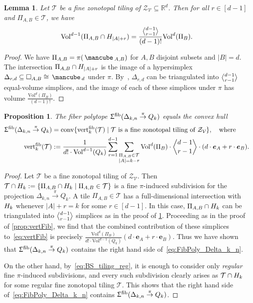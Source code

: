 \documentclass[11pt]{amsart}
\theoremstyle{plain}
\newtheorem{proposition}[theorem]{Proposition}
\newtheorem{lemma}[theorem]{Lemma}
\theoremstyle{definition}
\def\R{\mathbb{R}}
\def\V{\mathcal{V}}
\def\e{{\bm{e}}}
\def\conv{\mathrm{conv}}
\def\Zon{\mathcal{Z}}
\def\ZV{\Zon_\V}
\def\cube{\mbox{\,\mancube\,}}
\def\Vol{\mathrm{Vol}}
\def\vert{\mathrm{vert}}
\def\vertFib{\vert^\fiber}
\def\fiber{{\operatorname{fib}}}
\def\FibPoly{\Upsigma^\fiber}
\def\pito{\overset \pi \to}
\def\VC{\V}
\def\Tcal{\mathcal{T}}
\def\Tiling{\Tcal}
\def\tile{\Pi}
\newcommand\summa[2]{\sum_{\substack{#1 \\ #2}}}
\def\sumlevel#1{\summa{\tile_{A,B}\in\Tiling}{|A|=#1}}
\def\Voldd{\Vol^{d-1}}
\def\VolX(#1){\Vol^d(\tile_{#1})}
\def\VolB{\VolX(B)}
\let\subset\subseteq
\newcommand{\Euli}{\genfrac{\langle}{\rangle}{0pt}{}}
\def\Eul(#1,#2){\Euli{#1}{#2}}
\begin{document}
\begin{lemma}\label{lemma:Eul}
Let $\Tiling$ be a fine zonotopal tiling of $\ZV \subset \R^d$.
	Then for all $r\in[d-1]$ and $\tile_{A,B}\in\Tiling$, we have
\begin{equation}\label{eq:Eul}
\Voldd(\tile_{A,B}\cap \Hyp_{|A|+r})=\frac{\Eul(d-1,r-1)}{(d-1)!} \VolB.
\end{equation}
\end{lemma}
\begin{proof}
	We have $\tile_{A,B} = \pi(\cube_{A,B})$ for $A, B$ disjoint subsets
	and $|B| = d$.  The intersection $\tile_{A,B}\cap \Hyp_{|A|+r}$ is the image of a hypersimplex $\Delta_{r,d}\subset\square_{A,B}\cong\cube_d$ under $\pi$. By~\cite{Sta77}, $\Delta_{r,d}$ can be triangulated into $\Eul(d-1,r-1)$ equal-volume simplices, 
	and the image of each of these simplices under $\pi$ has volume $\frac{\VolB}{(d-1)!}$.
\end{proof}
\begin{proposition}
The fiber polytope $\FibPoly(\Delta_{k,n}\pito Q_k)$ equals the convex hull
\begin{align}\label{eq:FibPoly_Delta_k_n}
  \FibPoly(\Delta_{k,n}\pito Q_k)&=\conv\{\vertFib_k(\Tiling)\mid \Tiling\text{ is a fine zonotopal tiling of $\Zon_\VC$}\},\quad\text{where} \\
\label{eq:vertFib_k}
  \vertFib_k(\Tiling)&:=\frac1{d!\cdot \Voldd(Q_k)} \sum_{r=1}^{d-1} \sumlevel{k-r} \VolB\cdot \Eul(d-1,r-1)\cdot  (d\cdot \e_A+r\cdot  \e_B ).
\end{align}
\end{proposition}
\begin{proof}
Let $\Tiling$ be a fine zonotopal tiling of $\ZV$. Then $\Tiling\cap \Hyp_k:=\{\tile_{A,B}\cap \Hyp_k\mid \tile_{A,B}\in\Tiling\}$ is a fine $\pi$-induced subdivision for the projection $\Delta_{k,n}\pito Q_k$. A tile $\tile_{A,B}\in\Tiling$ has a full-dimensional intersection with $H_k$ whenever $|A|+r=k$ for some $r\in[d-1]$. In this case, $\tile_{A,B}\cap \Hyp_k$ can be triangulated into $\Eul(d-1,r-1)$ simplices as in the proof of \cref{lemma:Eul}. Proceeding as in the proof of \cref{prop:vertFib}, we find that the combined contribution of these simplices to~\eqref{eq:vertFib} is precisely $\frac{\VolB}{d!\cdot \Voldd(Q_k)}(d\cdot \e_A+r\cdot  \e_B )$. Thus we have shown that $\FibPoly(\Delta_{k,n}\pito Q_k)$ contains the right hand side of~\eqref{eq:FibPoly_Delta_k_n}. 

On the other hand, by~\eqref{eq:BS_tiling_reg}, it is enough to consider only \emph{regular} fine $\pi$-induced subdivisions, and every such subdivision clearly arises as $\Tiling\cap\Hyp_k$ for some regular fine zonotopal tiling $\Tiling$. This shows that the right hand side of~\eqref{eq:FibPoly_Delta_k_n} contains $\FibPoly(\Delta_{k,n}\pito Q_k)$.
\end{proof}
\end{document}

